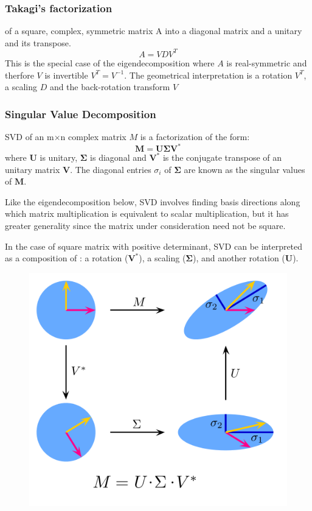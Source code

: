\documentclass[twocolumn]{article}
\numberwithin{equation}{section}
\begin{document}
		\subsubsection{Takagi's factorization}
of a square, complex, symmetric matrix A into a diagonal matrix and a unitary and its transpose. 
$$ A=VDV^T$$
This is the special case of the eigendecomposition where $A$ is real-symmetric and therfore $V$ is invertible $V^T=V^{-1}$.
The geometrical interpretation is a rotation $V^T$, a scaling $D$ and the back-rotation transform $V$

	
		\subsubsection{Singular Value Decomposition}	
SVD of an m$\times$n complex matrix $M$ is a factorization of the form:
$$\mathbf{M} = \mathbf{U} \boldsymbol{\Sigma} \mathbf{V}^*$$
where $ \mathbf{U}$ is unitary, $\boldsymbol{\Sigma}$ is diagonal and $\mathbf{V}^*$ is the conjugate transpose of an unitary matrix $\mathbf{V}$. The diagonal entries $\sigma_i$ of $\mathbf{\Sigma}$ are known as the singular values of $\mathbf{M}$.

Like the eigendecomposition below, SVD involves finding basis directions along which matrix multiplication is equivalent to scalar multiplication, but it has greater generality since the matrix under consideration need not be square.

In the case of square matrix with positive determinant, SVD  can be interpreted as a composition of : a rotation ($\mathbf{V}^*$), a scaling ($\mathbf{\Sigma}$), and another rotation ($\mathbf{U}$).

\begin{figure}[H]
\centering
    \includegraphics[width=.30\textwidth]{512px-Singular-Value-Decomposition.png}
\end{figure}






	
	
\end{document}
